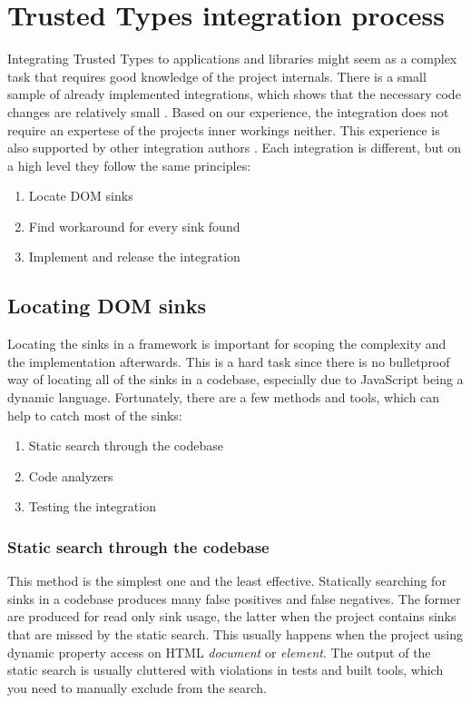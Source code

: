 \chapter{Trusted Types integration process}
\label{tt_integration_setup}

Integrating Trusted Types to applications and libraries might seem as a complex task that requires
good knowledge of the project internals. There is a small sample of already implemented
integrations, which shows that the necessary code changes are relatively small
\cite{tt_integration_list}. Based on our experience, the integration does not require an expertese
of the projects inner workings neither. This experience is also supported by other integration
authors \cite{tt_web_framework_paper}. Each integration is different, but on a high level they
follow the same principles:

\begin{enumerate}
  \item Locate DOM sinks
  \item Find workaround for every sink found
  \item Implement and release the integration
\end{enumerate}

\section{Locating DOM sinks}

Locating the sinks in a framework is important for scoping the complexity and the implementation
afterwards. This is a hard task since there is no bulletproof way of locating all of the sinks in a
codebase, especially due to JavaScript being a dynamic language. Fortunately, there are a few
methods and tools, which can help to catch most of the sinks:

\begin{enumerate}
  \item Static search through the codebase
  \item Code analyzers
  \item Testing the integration
\end{enumerate}

\subsection{Static search through the codebase}

This method is the simplest one and the least effective. Statically searching for sinks in a
codebase produces many false positives and false negatives. The former are produced for read only
sink usage, the latter when the project contains sinks that are missed by the static search. This
usually happens when the project using dynamic property access on HTML \emph{document} or
\emph{element}. The output of the static search is usually cluttered with violations in tests and
built tools, which you need to manually exclude from the search.

